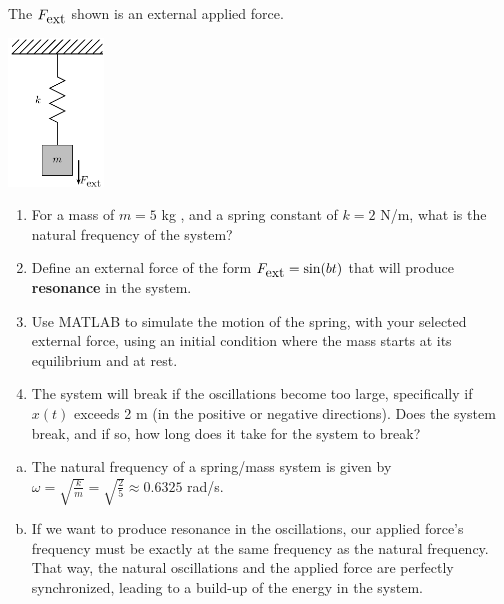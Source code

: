 \begin{enumerate}
\begin{Question}
\begin{minipage}[t]{0.6\linewidth}
The $F_{\mbox{ext}}$ shown is an external applied force.
    \end{minipage}
    \begin{minipage}[t]{0.3\linewidth}
\vspace{0pt}
\begin{center}
\includegraphics[width=1.0in]{graphics/Week08_Spring/SpringNoDampingWithFext}
\end{center}
    \end{minipage}


\begin{enumerate}
\item For a mass of $m = 5$ kg , and a spring constant of $k = 2$ N/m,
  what is the natural frequency of the system?
\item Define an external force of the form $F_{\mbox{ext}} = \sin(b t)$ that will
produce {\bf resonance} in the system.
\item Use MATLAB to simulate the motion of the spring, with your
  selected external force, using an initial condition where the mass
  starts at its equilibrium and at rest.
\item The system will break if the oscillations become too large,
  specifically if $x(t)$ exceeds 2 m (in the positive or negative
  directions).  Does the system break, and if so, how long does it
  take for the system to break?
\end{enumerate}
\end{Question}

\begin{Solution}
  \begin{enumerate}[(a)]
  \item The natural frequency of a spring/mass system is given by
    $\omega = \sqrt{\frac{k}{m}} = \sqrt{\frac{2}{5}} \approx 0.6325$
    rad/s.
  \item If we want to produce resonance in the oscillations, our
    applied force's frequency must be exactly at the same frequency as
    the natural frequency. That way, the natural oscillations and the
    applied force are perfectly synchronized, leading to a build-up of
    the energy in the system.  


\end{enumerate}
\end{Solution}
\end{enumerate}
